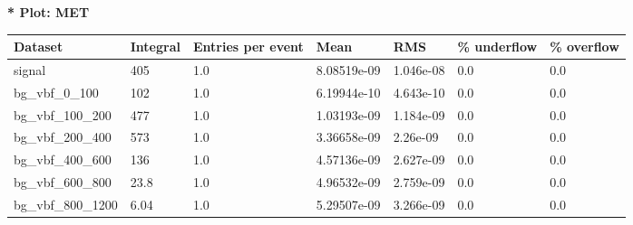 \documentclass[a4paper, 10pt]{article}
\begin{document}
\textbf{* Plot: MET}\\
   \begin{table}[H]
  \begin{center}
    \begin{tabular}{|m{23.0mm}|m{23.0mm}|m{18.0mm}|m{19.0mm}|m{19.0mm}|m{19.0mm}|m{19.0mm}|}
      \hline
      {\cellcolor{yellow}         Dataset}& {\cellcolor{yellow}         Integral}& {\cellcolor{yellow}         Entries per event}& {\cellcolor{yellow}         Mean}& {\cellcolor{yellow}         RMS}& {\cellcolor{yellow}         \% underflow}& {\cellcolor{yellow}         \% overflow}\\
      \hline
      {\cellcolor{white}         signal}& {\cellcolor{white}         405}& {\cellcolor{white}         1.0}& {\cellcolor{white}         8.08519e-09}& {\cellcolor{white}         1.046e-08}& {\cellcolor{green}         0.0}& {\cellcolor{green}         0.0}\\
      \hline
      {\cellcolor{white}         bg\_vbf\_0\_100}& {\cellcolor{white}         102}& {\cellcolor{white}         1.0}& {\cellcolor{white}         6.19944e-10}& {\cellcolor{white}         4.643e-10}& {\cellcolor{green}         0.0}& {\cellcolor{green}         0.0}\\
      \hline
      {\cellcolor{white}         bg\_vbf\_100\_200}& {\cellcolor{white}         477}& {\cellcolor{white}         1.0}& {\cellcolor{white}         1.03193e-09}& {\cellcolor{white}         1.184e-09}& {\cellcolor{green}         0.0}& {\cellcolor{green}         0.0}\\
      \hline
      {\cellcolor{white}         bg\_vbf\_200\_400}& {\cellcolor{white}         573}& {\cellcolor{white}         1.0}& {\cellcolor{white}         3.36658e-09}& {\cellcolor{white}         2.26e-09}& {\cellcolor{green}         0.0}& {\cellcolor{green}         0.0}\\
      \hline
      {\cellcolor{white}         bg\_vbf\_400\_600}& {\cellcolor{white}         136}& {\cellcolor{white}         1.0}& {\cellcolor{white}         4.57136e-09}& {\cellcolor{white}         2.627e-09}& {\cellcolor{green}         0.0}& {\cellcolor{green}         0.0}\\
      \hline
      {\cellcolor{white}         bg\_vbf\_600\_800}& {\cellcolor{white}         23.8}& {\cellcolor{white}         1.0}& {\cellcolor{white}         4.96532e-09}& {\cellcolor{white}         2.759e-09}& {\cellcolor{green}         0.0}& {\cellcolor{green}         0.0}\\
      \hline
      {\cellcolor{white}         bg\_vbf\_800\_1200}& {\cellcolor{white}         6.04}& {\cellcolor{white}         1.0}& {\cellcolor{white}         5.29507e-09}& {\cellcolor{white}         3.266e-09}& {\cellcolor{green}         0.0}& {\cellcolor{green}         0.0}\\

\end{tabular}
\end{center}
\end{table}
\end{document}
